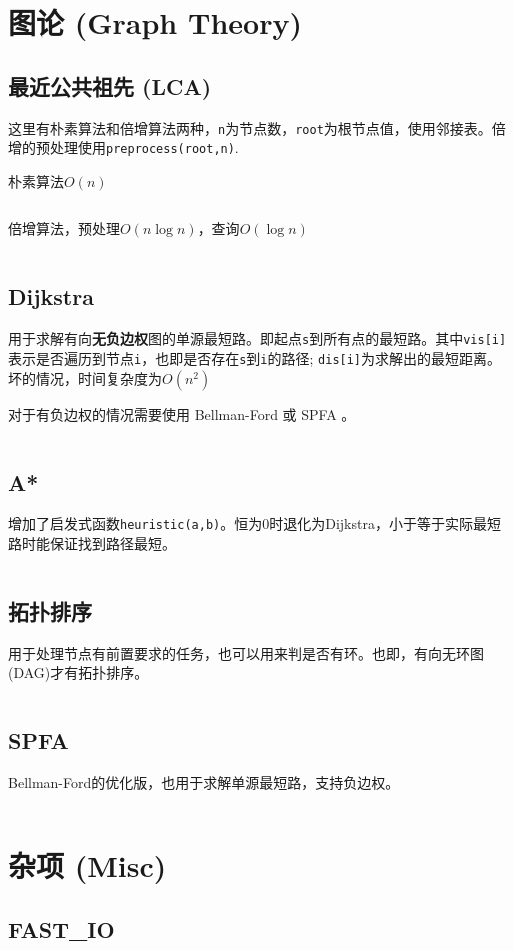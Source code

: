 \documentclass[openany,a4paper]{book}
\begin{document}
\chapter{图论 (Graph Theory)}
\section{最近公共祖先 (LCA)}
这里有朴素算法和倍增算法两种，\verb|n|为节点数，\verb|root|为根节点值，使用邻接表。倍增的预处理使用\verb|preprocess(root,n)|.
\par 朴素算法$O(n)$
\inputminted{cpp}{GraphTheory/LCA-1.h}
倍增算法，预处理$O(n\log n)$，查询$O(\log n)$
\inputminted{cpp}{GraphTheory/LCA-2.h}


\section{Dijkstra}
用于求解有向\textbf{无负边权}图的单源最短路。即起点\verb|s|到所有点的最短路。其中\verb|vis[i]|表示是否遍历到节点\verb|i|，也即是否存在\verb|s|到\verb|i|的路径; \verb|dis[i]|为求解出的最短距离。坏的情况，时间复杂度为$O(n^2)$
\par 对于有负边权的情况需要使用 Bellman-Ford 或 SPFA 。
\inputminted{cpp}{GraphTheory/Dijkstra.h}

\section{A*}
增加了启发式函数\verb|heuristic(a,b)|。恒为0时退化为Dijkstra，小于等于实际最短路时能保证找到路径最短。
\inputminted{cpp}{GraphTheory/Astar.h}

\section{拓扑排序}
用于处理节点有前置要求的任务，也可以用来判是否有环。也即，有向无环图(DAG)才有拓扑排序。
\inputminted{cpp}{GraphTheory/TopoSort.h}

\section{SPFA}
Bellman-Ford的优化版，也用于求解单源最短路，支持负边权。
\inputminted{cpp}{GraphTheory/SPFA.h}

\chapter{杂项 (Misc)}

\section{FAST\_IO}
\inputminted{cpp}{Misc/fast_io.h}
\end{document}
